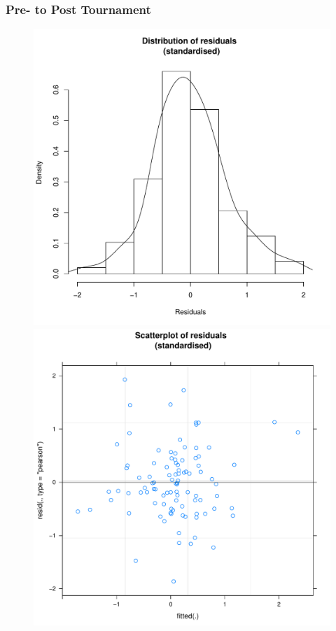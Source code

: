 \begin{CJK}{UTF8}{gbsn}
 \subsubsection{Pre- to Post Tournament\label{app8:prediction1aPrePost}}

 

 \begin{figure}[htbp]
   \includegraphics[scale =.4]{images/MLM21aHist.pdf}
   \includegraphics[scale =.4]{images/MLM21aScatter.pdf}

\end{figure}
\end{CJK}

